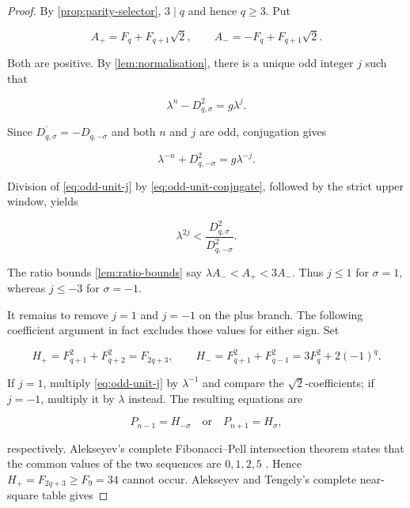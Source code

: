 \begin{proof}
By \cref{prop:parity-selector}, $3\mid q$ and hence $q\geqslant3$. Put

\begin{equation}
 A_+=F_q+F_{q+1}\sqrt2,
 \qquad
 A_-=-F_q+F_{q+1}\sqrt2.
 \label{eq:odd-Apm}
\end{equation}

Both are positive. By \cref{lem:normalisation}, there is a unique odd
integer $j$ such that

\begin{equation}
 \lambda^n-D_{q,\sigma}^2=g\lambda^j.
 \label{eq:odd-unit-j}
\end{equation}

Since $\overline{D_{q,\sigma}}=-D_{q,-\sigma}$ and both $n$ and $j$ are
odd, conjugation gives

\begin{equation}
 \lambda^{-n}+D_{q,-\sigma}^2=g\lambda^{-j}.
 \label{eq:odd-unit-conjugate}
\end{equation}

Division of \cref{eq:odd-unit-j} by
\cref{eq:odd-unit-conjugate}, followed by the strict upper window, yields

\begin{equation}
 \lambda^{2j}
 <\frac{D_{q,\sigma}^2}{D_{q,-\sigma}^2}.
 \label{eq:odd-j-ratio}
\end{equation}

The ratio bounds \cref{lem:ratio-bounds} say
$\lambda A_-<A_+<3A_-$. Thus $j\leqslant1$ for $\sigma=1$, whereas
$j\leqslant-3$ for $\sigma=-1$.

It remains to remove $j=1$ and $j=-1$ on the plus branch. The following
coefficient argument in fact excludes those values for either sign. Set

\begin{equation}
 H_+=F_{q+1}^2+F_{q+2}^2=F_{2q+3},
 \qquad
 H_-=F_{q+1}^2+F_{q-1}^2
 =3F_q^2+2(-1)^q.
 \label{eq:odd-seed-heights}
\end{equation}

If $j=1$, multiply \cref{eq:odd-unit-j} by $\lambda^{-1}$ and compare
the $\sqrt2$-coefficients; if $j=-1$, multiply it by $\lambda$ instead.
The resulting equations are

\begin{equation}
 P_{n-1}=H_{-\sigma}
 \quad\text{or}\quad
 P_{n+1}=H_\sigma,
 \label{eq:odd-leading-intersections}
\end{equation}

respectively. Alekseyev's complete Fibonacci--Pell intersection theorem
states that the common values of the two sequences are $0,1,2,5$
\cite[Theorem~9]{Alekseyev2011}. Hence $H_+=F_{2q+3}\geqslant F_9=34$
cannot occur. Alekseyev and Tengely's complete near-square table gives


\end{proof}
